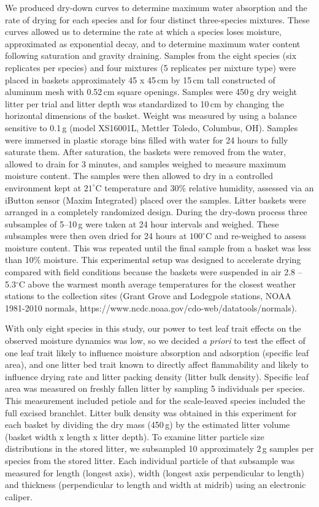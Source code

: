 \documentclass[letterpaper,12pt]{article}
\begin{document}
We produced dry-down curves to determine maximum water absorption and the rate
of drying for each species and for four distinct three-species mixtures. These
curves allowed us to determine the rate at which a species loses moisture,
approximated as exponential decay, and to determine maximum water content
following saturation and gravity draining. Samples from the eight species (six
replicates per species) and four mixtures (5 replicates per mixture type) were
placed in baskets approximately 45 x 45\,cm by 15\,cm tall constructed of
aluminum mesh with 0.52\,cm square openings. Samples were 450\,g dry weight
litter per trial and litter depth was standardized to 10\,cm by changing the
horizontal dimensions of the basket. Weight was measured by using a balance
sensitive to 0.1\,g (model XS16001L, Mettler Toledo, Columbus, OH). Samples
were immersed in plastic storage bins filled with water for 24 hours to fully
saturate them. After saturation, the baskets were removed from the water,
allowed to drain for 3 minutes, and samples weighed to measure maximum moisture
content. The samples were then allowed to dry in a controlled environment kept
at $21^\circ$C temperature and 30\% relative humidity, assessed via an iButton
sensor (Maxim Integrated) placed over the samples. Litter baskets were arranged
in a completely randomized design. During the dry-down process three subsamples
of 5--10\,g were taken at 24 hour intervals and weighed. These subsamples were
then oven dried for 24 hours at $100^\circ$C and re-weighed to assess moisture
content. This was repeated until the final sample from a basket was less than
10\% moisture. This experimental setup was designed to accelerate drying
compared with field conditions because the baskets were suspended in air 2.8 --
5.3$^\circ$C above the warmest month average temperatures for the closest
weather stations to the collection sites (Grant Grove and Lodegpole stations,
NOAA 1981-2010 normals, https://www.ncdc.noaa.gov/cdo-web/datatools/normals).


With only eight species in this study, our power to test leaf trait effects on
the observed moisture dynamics was low, so we decided \emph{a priori} to test
the effect of one leaf trait likely to influence moisture absorption and
adsorption (specific leaf area), and one litter bed trait known to directly
affect flammability and likely to influence drying rate and litter packing
density (litter bulk density). Specific leaf area was measured on freshly
fallen litter by sampling 5 individuals per species. This measurement included
petiole and for the scale-leaved species included the full excised branchlet.
Litter bulk density was obtained in this experiment for each basket by dividing
the dry mass (450\,g) by the estimated litter volume (basket width x length x
litter depth). To examine litter particle size distributions in the stored
litter, we subsampled 10 approximately 2\,g samples per species from the stored
litter. Each individual particle of that subsample was measured for length
(longest axis), width (longest axis perpendicular to length) and thickness
(perpendicular to length and width at midrib) using an electronic caliper.
\end{document}
